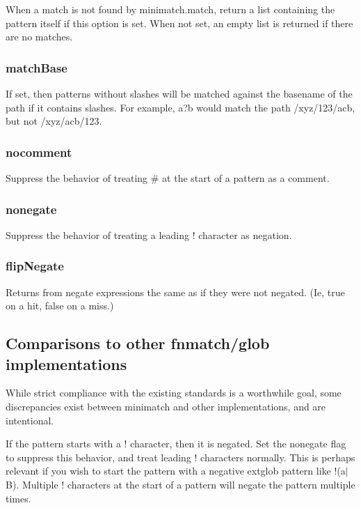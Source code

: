 When a match is not found by {\ttfamily minimatch.\+match}, return a list containing the pattern itself if this option is set. When not set, an empty list is returned if there are no matches.

\subsubsection*{match\+Base}

If set, then patterns without slashes will be matched against the basename of the path if it contains slashes. For example, {\ttfamily a?b} would match the path {\ttfamily /xyz/123/acb}, but not {\ttfamily /xyz/acb/123}.

\subsubsection*{nocomment}

Suppress the behavior of treating {\ttfamily \#} at the start of a pattern as a comment.

\subsubsection*{nonegate}

Suppress the behavior of treating a leading {\ttfamily !} character as negation.

\subsubsection*{flip\+Negate}

Returns from negate expressions the same as if they were not negated. (Ie, true on a hit, false on a miss.)

\subsection*{Comparisons to other fnmatch/glob implementations}

While strict compliance with the existing standards is a worthwhile goal, some discrepancies exist between minimatch and other implementations, and are intentional.

If the pattern starts with a {\ttfamily !} character, then it is negated. Set the {\ttfamily nonegate} flag to suppress this behavior, and treat leading {\ttfamily !} characters normally. This is perhaps relevant if you wish to start the pattern with a negative extglob pattern like {\ttfamily !(a$\vert$B)}. Multiple {\ttfamily !} characters at the start of a pattern will negate the pattern multiple times.


